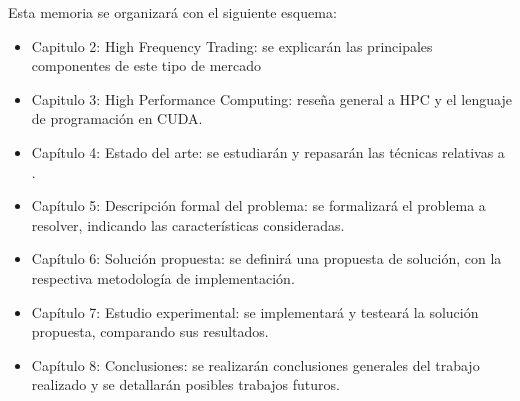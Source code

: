 Esta memoria se organizará con el siguiente esquema:
\begin{itemize}
	\item Capitulo 2: High Frequency Trading: se explicarán las principales 
	componentes de este tipo de mercado
	\item Capitulo 3: High Performance Computing: reseña general a HPC y el 
	lenguaje de programación en CUDA.
	\item Capítulo 4: Estado del arte: se estudiarán y repasarán las técnicas
relativas a .
	\item Capítulo 5: Descripción formal del problema: se formalizará el
problema a resolver, indicando las características consideradas.
	\item Capítulo 6: Solución propuesta: se definirá una propuesta de
solución, con la respectiva metodología de implementación. 
	\item Capítulo 7: Estudio experimental: se implementará y testeará la
solución propuesta, comparando sus resultados.
	\item Capítulo 8: Conclusiones: se realizarán conclusiones generales del
trabajo realizado y se detallarán posibles trabajos futuros.
\end{itemize}
